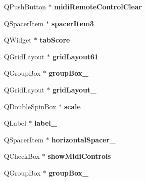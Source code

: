 \begin{DoxyCompactItemize}
Q\+Push\+Button $\ast$ {\bfseries midi\+Remote\+Control\+Clear}
\item 
\mbox{\label{class_ui___prefs_dialog_base_a3b0aedbaa0fdc8af32216cfc649d19ab}} 
Q\+Spacer\+Item $\ast$ {\bfseries spacer\+Item3}
\item 
\mbox{\label{class_ui___prefs_dialog_base_ac2bcf01192cd57db471f1a15c7bb758b}} 
Q\+Widget $\ast$ {\bfseries tab\+Score}
\item 
\mbox{\label{class_ui___prefs_dialog_base_a05d45f389c405dab36f5862514eb3980}} 
Q\+Grid\+Layout $\ast$ {\bfseries grid\+Layout61}
\item 
\mbox{\label{class_ui___prefs_dialog_base_a5e8425171ce18e083a03c3b69090cede}} 
Q\+Group\+Box $\ast$ {\bfseries group\+Box\+\_}
\item 
\mbox{\label{class_ui___prefs_dialog_base_aa3822b26dc2faf130b294a12d8d3fba9}} 
Q\+Grid\+Layout $\ast$ {\bfseries grid\+Layout\+\_}
\item 
\mbox{\label{class_ui___prefs_dialog_base_a0e876b337fe1add2fed7bb3fe62e5d38}} 
Q\+Double\+Spin\+Box $\ast$ {\bfseries scale}
\item 
\mbox{\label{class_ui___prefs_dialog_base_a59f76452acc0e7fe772eb17a745d95fa}} 
Q\+Label $\ast$ {\bfseries label\+\_}
\item 
\mbox{\label{class_ui___prefs_dialog_base_a2e326d0a728d00d16d2557f3b1d7f1cc}} 
Q\+Spacer\+Item $\ast$ {\bfseries horizontal\+Spacer\+\_}
\item 
\mbox{\label{class_ui___prefs_dialog_base_ae355f2a72b0782fa6676d28650051e1d}} 
Q\+Check\+Box $\ast$ {\bfseries show\+Midi\+Controls}
\item 
\mbox{\label{class_ui___prefs_dialog_base_a4af52b42a22f63b20ed32b033054ee2a}} 
Q\+Group\+Box $\ast$ {\bfseries group\+Box\+\_}
\item 

\end{DoxyCompactItemize}
